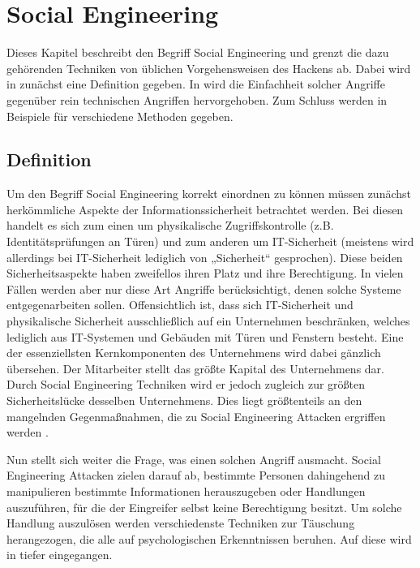 
\section{Social Engineering}\label{sec:social_engineering}
Dieses Kapitel beschreibt den Begriff Social Engineering und grenzt die dazu gehörenden Techniken von
üblichen Vorgehensweisen des Hackens ab. Dabei wird in  zunächst eine
Definition gegeben.
In  wird die Einfachheit solcher Angriffe gegenüber
rein technischen Angriffen hervorgehoben.
Zum Schluss werden in  Beispiele für verschiedene Methoden gegeben.

\subsection{Definition}\label{sec:definition}
Um den Begriff Social Engineering korrekt einordnen zu können müssen zunächst herkömmliche Aspekte der
Informationssicherheit betrachtet werden.
Bei diesen handelt es sich zum einen um physikalische Zugriffskontrolle (z.B. Identitätsprüfungen an
Türen) und zum anderen um IT-Sicherheit (meistens wird allerdings bei IT-Sicherheit lediglich von
„Sicherheit“ gesprochen).
Diese beiden Sicherheitsaspekte haben zweifellos ihren Platz und ihre Berechtigung.
In vielen Fällen werden aber nur diese Art Angriffe berücksichtigt, denen solche Systeme
entgegenarbeiten sollen.
Offensichtlich ist, dass sich IT-Sicherheit und physikalische Sicherheit ausschließlich auf ein
Unternehmen beschränken, welches lediglich aus IT-Systemen und Gebäuden mit Türen und Fenstern
besteht.
Eine der essenziellsten Kernkomponenten des Unternehmens wird dabei gänzlich übersehen.
Der Mitarbeiter stellt das größte Kapital des Unternehmens dar.
Durch Social Engineering Techniken wird er jedoch zugleich zur größten Sicherheitslücke desselben Unternehmens.
Dies liegt größtenteils an den mangelnden Gegenmaßnahmen, die zu Social Engineering Attacken ergriffen werden \citep{hacking-the-human}.

Nun stellt sich weiter die Frage, was einen solchen Angriff ausmacht.
Social Engineering Attacken zielen darauf ab, bestimmte Personen dahingehend zu manipulieren bestimmte
Informationen herauszugeben oder Handlungen auszuführen, für die der Eingreifer selbst keine
Berechtigung besitzt.
Um solche Handlung auszulösen werden verschiedenste Techniken zur Täuschung herangezogen, die alle auf
psychologischen Erkenntnissen beruhen.
Auf diese wird in  tiefer eingegangen.

